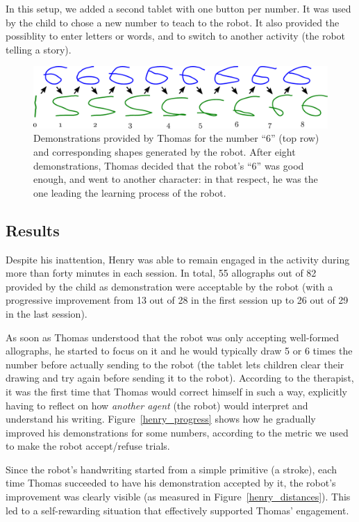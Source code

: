 \documentclass{sig-alternate}
\begin{document}
In this setup, we added a second tablet with one button per number. It was used
by the child to chose a new number to teach to the robot. It also provided the
possiblity to enter letters or words, and to switch to another activity (the
robot telling a story).

\begin{figure}
    \centering
    \includegraphics[width=0.9\linewidth]{learning_6_demos}
    \caption{\small Demonstrations provided by Thomas for the number ``6'' (top row) and
        corresponding shapes generated by the robot. After eight demonstrations,
        Thomas decided that the robot's ``6'' was good enough, and went to
    another character: in that respect, he was the one leading the learning
process of the robot.}
    \label{learning_6_demos}
\end{figure}

\subsection{Results}
Despite his inattention, Henry was able to remain engaged in the activity during more than
forty minutes in each session. In total, 55 allographs out of 82 
provided by the child as demonstration were acceptable by the robot (with a
progressive improvement from 13 out of 28 in the first session up to 26 out
of 29 in the last session).

As soon as Thomas understood that the robot was only accepting well-formed
allographs, he started to focus on it and he would typically draw 5 or 6 times
the number before actually sending to the robot (the tablet lets children
clear their drawing and try again before sending it to the robot). According to
the therapist, it was the first time that Thomas would correct himself in such a
way, explicitly having to reflect on how \emph{another agent} (the robot) would
interpret and understand his writing. Figure~\ref{henry_progress} shows how
he gradually improved his demonstrations for some numbers, according to the
metric we used to make the robot accept/refuse trials.

Since the robot's handwriting started from a simple primitive (a stroke), each
time Thomas succeeded to have his demonstration accepted by it, the robot's
improvement was clearly visible (as measured in Figure~\ref{henry_distances}).
This led to a self-rewarding situation that effectively supported Thomas'
engagement.
\end{document}
